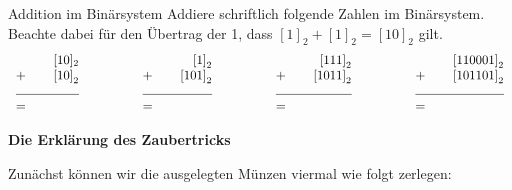 \documentclass{uebungszettel}
\begin{document}

\begin{aufgabe}{Addition im Binärsystem}
Addiere schriftlich folgende Zahlen im Binärsystem. Beachte dabei für den Übertrag der 1, dass $[1]_2 + [1]_2 = [10]_2$ gilt.
\[\begin{array}{rrrrrrrrr}
[10]_{2} & \quad \quad \quad & \left[ 1 \right]_2 & \quad \quad \quad & \left[ 111 \right]_2 & \quad \quad \quad & \left[ 110001 \right]_2 \\
+ \quad \quad \left[ 10 \right]_{2} & & + \quad \quad \left[ 101 \right]_2 & & + \quad \quad \left[ 1011 \right]_2 & & + \quad \quad \left[ 101101 \right]_2 \\
\hrulefill & & \hrulefill & & \hrulefill & & \hrulefill\\
= \hfill & & = \hfill & & = \hfill & & = \hfill
\end{array}\]
\end{aufgabe}

\pagebreak
\Large
\begin{center}
 \textbf{Die Erklärung des Zaubertricks}
\end{center}
\normalsize

Zunächst können wir die ausgelegten Münzen viermal wie folgt zerlegen:
\end{document}
